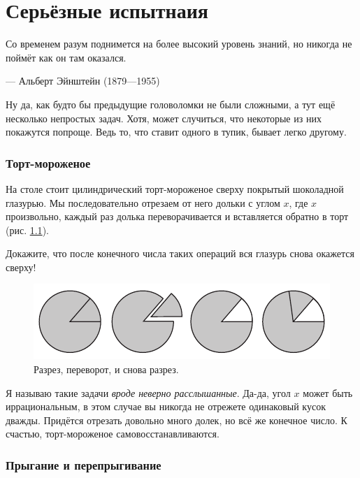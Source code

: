 \chapter{Серьёзные испытнаия}


\setlength{\epigraphwidth}{.80\textwidth}
\epigraph{Со временем разум поднимется на более высокий уровень знаний, но никогда не поймёт как он там оказался.
}{--- Альберт Эйнштейн (1879---1955)}

Ну да, как будто бы предыдущие головоломки не были сложными, а тут ещё несколько непростых задач.
Хотя, может случиться, что некоторые из них покажутся попроще.
Ведь то, что ставит одного в тупик, бывает легко другому.


\subsection*{Торт-мороженое}\label{Торт-мороженое}

На столе стоит цилиндрический торт-мороженое сверху покрытый шоколадной глазурью.
Мы последовательно отрезаем от него дольки с углом $x$, где $x$ произвольно,
каждый раз долька переворачивается и вставляется обратно в торт
(рис. \ref{pic:tort}).

Докажите, что после конечного числа таких операций вся глазурь снова окажется сверху!


\begin{figure}[htb!]
\centering
\includegraphics[scale=1]{pics/tort}
\caption{Разрез, переворот, и снова разрез.}
\label{pic:tort}
\end{figure}

Я называю такие задачи \emph{вроде неверно расслышанные}.
Да-да, угол $x$ может быть иррациональным, в этом случае вы никогда не отрежете одинаковый кусок дважды.
Придётся отрезать довольно много долек, но всё же конечное число.
К счастью, торт-мороженое самовосстанавливаются.

\subsection*{Прыгание и перепрыгивание}

